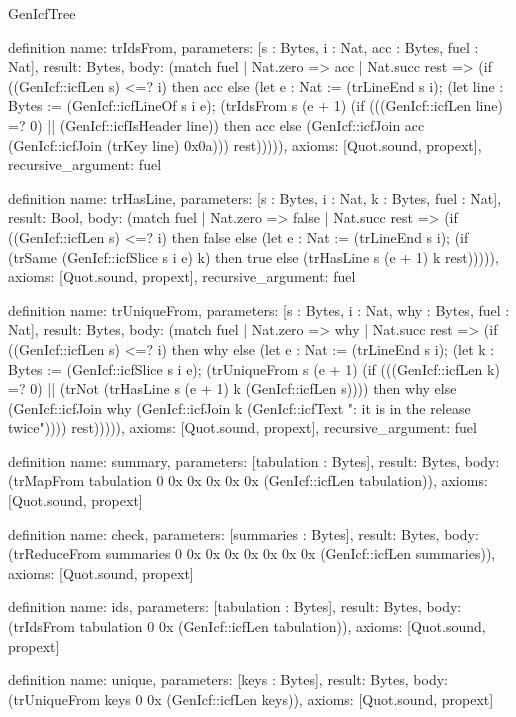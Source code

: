 \begin{lexlean}{GenIcfTree}
\begin{semanticmodule}
definition{
  name: trIdsFrom,
  parameters: [s : Bytes, i : Nat, acc : Bytes, fuel : Nat],
  result: Bytes,
  body: (match fuel
    | Nat.zero => acc
    | Nat.succ rest => (if ((GenIcf::icfLen s) <=? i) then acc else (let e : Nat := (trLineEnd s i); (let line : Bytes := (GenIcf::icfLineOf s i e); (trIdsFrom s (e + 1) (if (((GenIcf::icfLen line) =? 0) || (GenIcf::icfIsHeader line)) then acc else (GenIcf::icfJoin acc (GenIcf::icfJoin (trKey line) 0x0a))) rest))))),
  axioms: [Quot.sound, propext],
  recursive_argument: fuel
}

definition{
  name: trHasLine,
  parameters: [s : Bytes, i : Nat, k : Bytes, fuel : Nat],
  result: Bool,
  body: (match fuel
    | Nat.zero => false
    | Nat.succ rest => (if ((GenIcf::icfLen s) <=? i) then false else (let e : Nat := (trLineEnd s i); (if (trSame (GenIcf::icfSlice s i e) k) then true else (trHasLine s (e + 1) k rest))))),
  axioms: [Quot.sound, propext],
  recursive_argument: fuel
}

definition{
  name: trUniqueFrom,
  parameters: [s : Bytes, i : Nat, why : Bytes, fuel : Nat],
  result: Bytes,
  body: (match fuel
    | Nat.zero => why
    | Nat.succ rest => (if ((GenIcf::icfLen s) <=? i) then why else (let e : Nat := (trLineEnd s i); (let k : Bytes := (GenIcf::icfSlice s i e); (trUniqueFrom s (e + 1) (if (((GenIcf::icfLen k) =? 0) || (trNot (trHasLine s (e + 1) k (GenIcf::icfLen s)))) then why else (GenIcf::icfJoin why (GenIcf::icfJoin k (GenIcf::icfText ": it is in the release twice\n")))) rest))))),
  axioms: [Quot.sound, propext],
  recursive_argument: fuel
}

definition{
  name: summary,
  parameters: [tabulation : Bytes],
  result: Bytes,
  body: (trMapFrom tabulation 0 0x 0x 0x 0x 0x (GenIcf::icfLen tabulation)),
  axioms: [Quot.sound, propext]
}

definition{
  name: check,
  parameters: [summaries : Bytes],
  result: Bytes,
  body: (trReduceFrom summaries 0 0x 0x 0x 0x 0x 0x 0x (GenIcf::icfLen summaries)),
  axioms: [Quot.sound, propext]
}

definition{
  name: ids,
  parameters: [tabulation : Bytes],
  result: Bytes,
  body: (trIdsFrom tabulation 0 0x (GenIcf::icfLen tabulation)),
  axioms: [Quot.sound, propext]
}

definition{
  name: unique,
  parameters: [keys : Bytes],
  result: Bytes,
  body: (trUniqueFrom keys 0 0x (GenIcf::icfLen keys)),
  axioms: [Quot.sound, propext]
}
\end{semanticmodule}
\end{lexlean}
